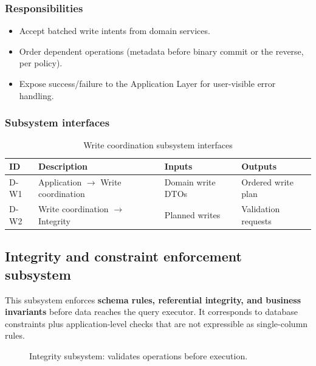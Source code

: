 \subsubsection{Responsibilities}
\begin{itemize}
  \item Accept batched write intents from domain services.
  \item Order dependent operations (metadata before binary commit or the reverse, per policy).
  \item Expose success/failure to the Application Layer for user-visible error handling.
\end{itemize}

\subsubsection{Subsystem interfaces}
\begin{table}[H]
\centering
\small
\begin{tabular}{|p{0.85cm}|p{3.5cm}|p{3.0cm}|p{3.5cm}|}
\hline
\textbf{ID} & \textbf{Description} & \textbf{Inputs} & \textbf{Outputs} \\
\hline
D-W1 & Application $\rightarrow$ Write coordination & Domain write DTOs & Ordered write plan \\
\hline
D-W2 & Write coordination $\rightarrow$ Integrity & Planned writes & Validation requests \\
\hline
\end{tabular}
\caption{Write coordination subsystem interfaces}
\end{table}

\subsection{Integrity and constraint enforcement subsystem}

This subsystem enforces \textbf{schema rules, referential integrity, and business invariants} before data reaches the query executor. It corresponds to database constraints plus application-level checks that are not expressible as single-column rules.

\begin{figure}[H]
\centering
{}
\caption{Integrity subsystem: validates operations before execution.}
\label{fig:data-integrity}
\end{figure}


